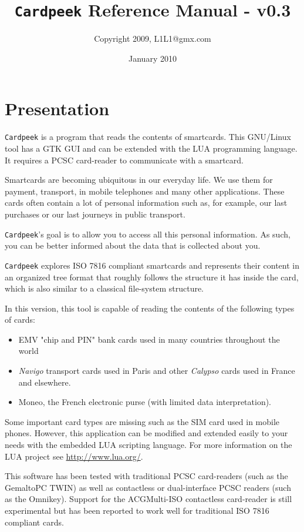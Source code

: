\documentclass[11pt]{report}
\title{\texttt{Cardpeek} Reference Manual - v0.3}
\author{Copyright 2009, L1L1@gmx.com}
\date{January 2010}
\begin{document}
\maketitle

\chapter*{Presentation}

\texttt{Cardpeek} is a program that reads the contents of smartcards. 
This GNU/Linux tool has a GTK GUI and can be extended with the LUA programming language. 
It requires a PCSC card-reader to communicate with a smartcard.

Smartcards are becoming ubiquitous in our everyday life. 
We use them for payment, transport, in mobile telephones and many other applications.
These cards often contain a lot of personal information such as, for example, our last purchases or our last journeys in public transport.

\texttt{Cardpeek}'s goal is to allow you to access all this personal information. As such, you can be better informed about the data that is collected about you.

\texttt{Cardpeek} explores ISO 7816 compliant smartcards and represents their content in an organized tree format that roughly follows the structure it has inside the card, which is also similar to a classical file-system structure.

In this version, this tool is capable of reading the contents of the following types of cards:
\begin{itemize}
\item{EMV "chip and PIN" bank cards used in many countries throughout the world}
\item{\textit{Navigo} transport cards used in Paris and other \textit{Calypso} cards used in France and elsewhere.}
\item{Moneo, the French electronic purse (with limited data interpretation).}
\end{itemize}

Some important card types are missing such as the SIM card used in mobile phones.
However, this application can be modified and extended easily to your needs with the embedded LUA scripting language.
For more information on the LUA project see \url{http://www.lua.org/}.

This software has been tested with traditional PCSC card-readers (such as the Gemalto\texttrademark PC TWIN) as well as contactless or dual-interface PCSC readers (such as the Omnikey). 
Support for the ACG\texttrademark Multi-ISO contactless card-reader is still experimental but has been reported to work well for traditional ISO 7816 compliant cards.
\end{document}
